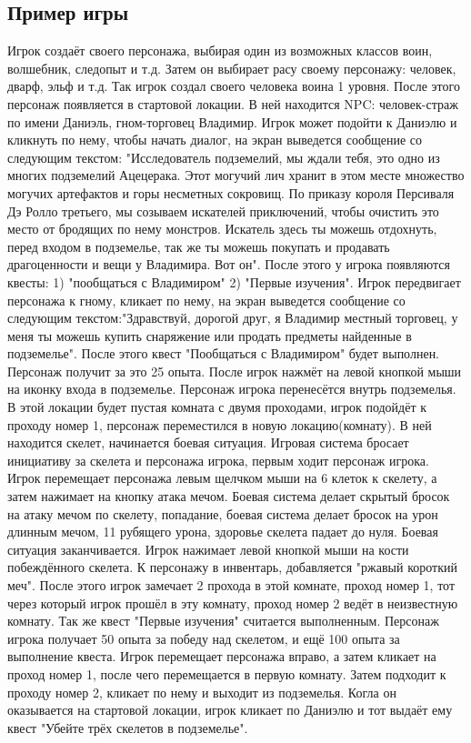 \subsection{Пример игры}
Игрок создаёт своего персонажа, выбирая один из возможных классов воин, волшебник, следопыт и т.д. Затем он выбирает расу своему персонажу: человек, дварф, эльф и т.д. Так игрок создал своего человека воина 1 уровня. После этого персонаж появляется в стартовой локации. В ней находится NPC: человек-страж по имени Даниэль, гном-торговец Владимир. Игрок может подойти к Даниэлю и кликнуть по нему, чтобы начать диалог, на экран выведется сообщение со следующим текстом: "Исследователь подземелий, мы ждали тебя, это одно из многих подземелий Ацецерака. Этот могучий лич хранит в этом месте множество могучих артефактов и горы несметных сокровищ. По приказу короля Персиваля Дэ Ролло третьего, мы созываем искателей приключений, чтобы очистить это место от бродящих по нему монстров. Искатель здесь ты можешь отдохнуть, перед входом в подземелье, так же ты можешь покупать и продавать драгоценности и вещи у Владимира. Вот он". После этого у игрока появляются квесты: 1) "пообщаться с Владимиром" 2) "Первые изучения". Игрок передвигает персонажа к гному, кликает по нему, на экран выведется сообщение со следующим текстом:"Здравствуй, дорогой друг, я Владимир местный торговец, у меня ты можешь купить снаряжение или продать предметы найденные в подземелье". После этого квест "Пообщаться с Владимиром" будет выполнен. Персонаж получит за это 25 опыта. После игрок нажмёт на левой кнопкой мыши на иконку входа в подземелье. Персонаж игрока перенесётся внутрь подземелья. В этой локации будет пустая комната с двумя проходами, игрок подойдёт к проходу номер 1, персонаж переместился в новую локацию(комнату). В ней находится скелет, начинается боевая ситуация. Игровая система бросает инициативу за скелета и персонажа игрока, первым ходит персонаж игрока. Игрок перемещает персонажа левым щелчком мыши на 6 клеток к скелету, а затем нажимает на кнопку атака мечом. Боевая система делает скрытый бросок на атаку мечом по скелету, попадание, боевая система делает бросок на урон длинным мечом, 11 рубящего урона, здоровье скелета падает до нуля. Боевая ситуация заканчивается. Игрок нажимает левой кнопкой мыши на кости побеждённого скелета. К персонажу в инвентарь, добавляется "ржавый короткий меч". После этого игрок замечает 2 прохода в этой комнате, проход номер 1, тот через который игрок прошёл в эту комнату, проход номер 2 ведёт в неизвестную комнату. Так же квест "Первые изучения" считается выполненным. Персонаж игрока получает 50 опыта за победу над скелетом, и ещё 100 опыта за выполнение квеста. Игрок перемещает персонажа вправо, а затем кликает на проход номер 1, после чего перемещается в первую комнату. Затем подходит к проходу номер 2, кликает по нему и выходит из подземелья. Когла он оказывается на стартовой локации, игрок кликает по Даниэлю и тот выдаёт ему квест "Убейте трёх скелетов в подземелье".

